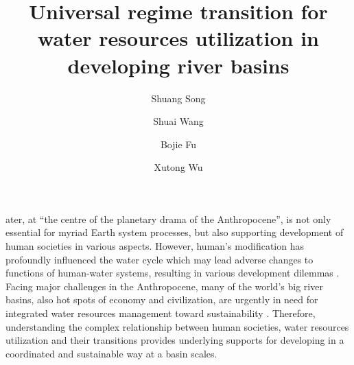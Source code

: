 \documentclass[9pt, twocolumn, twoside, lineno]{pnas-new}
\title{Universal regime transition for water resources utilization in developing river basins}
\author[a, b]{Shuang Song}  %
\author[a, b, 1]{Shuai Wang}  %
\author[a, b]{Bojie Fu}  %
\author[c, d]{Xutong Wu}  %
\affil[a]{ %
	State Key Laboratory of Earth Surface Processes and Resource Ecology, 
	Faculty of Geographical Science, 
	Beijing Normal University, 
	Beijing 100875, 
	P.R. China
}
\affil[b]{ %
	Institute of Land Surface System and Sustainability, 
	Faculty of Geographical Science, 
	Beijing Normal University, 
	Beijing 100875, 
	P.R. China
}
\affil[c]{ %
	College of Urban and Environmental Sciences, 
	Peking University, 
	Beijing 100871, 
	P.R. China
}
\affil[d]{ %
	State Key Laboratory of Urban and Regional Ecology, 
	Research Center for Eco-Environmental Sciences, 
	Chinese Academy of Sciences, 
	Beijing 100085, 
	P.R. China 
}
\begin{document}
\maketitle
\thispagestyle{firststyle}

ater, at “the centre of the planetary drama of the Anthropocene”, is not only essential for myriad Earth system processes, but also supporting development of human societies in various aspects. 
However, human's modification has profoundly influenced the water cycle which may lead adverse changes to functions of human-water systems, resulting in various development dilemmas \cite{gleesonIlluminatingWaterCycle2020,cummingLinkingEconomicGrowth2018}.
Facing major challenges in the Anthropocene, many of the world's big river basins, also hot spots of economy and civilization, are urgently in need for integrated water resources management toward sustainability \cite{bestAnthropogenicStressesWorld2019}. 
Therefore, understanding the complex relationship between human societies, water resources utilization and their transitions provides underlying supports for developing in a coordinated and sustainable way at a basin scales.
\end{document}
